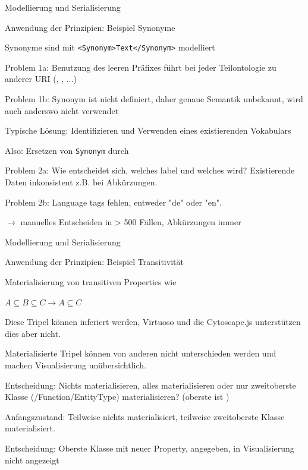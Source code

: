 \documentclass[14pt,aspectratio=1610]{beamer}
\begin{document}
\begin{frame}[fragile]{Modellierung und Serialisierung}
\begin{block}{Anwendung der Prinzipien: Beispiel Synonyme}
\begin{itemize}
{
\item Synonyme sind mit \texttt{<Synonym>Text</Synonym>} modelliert 
\item Problem 1a: Benutzung des leeren Präfixes führt bei jeder Teilontologie zu anderer URI (, , $\ldots$) 
\item Problem 1b: Synonym ist nicht definiert, daher genaue Semantik unbekannt, wird auch anderswo nicht verwendet
}
{
\item Typische Lösung: Identifizieren und Verwenden eines existierenden Vokabulars
\item Also: Ersetzen von \texttt{Synonym} durch \texttt{}
\item Problem 2a: Wie entscheidet sich, welches label  und welches  wird? Existierende Daten inkonsistent z.B. bei Abkürzungen. 
\item Problem 2b: Language tags fehlen, entweder "de" oder "en".
\item $\rightarrow$ manuelles Entscheiden in > 500 Fällen, Abkürzungen immer 
}
\end{itemize}
\end{block}
\end{frame}

\begin{frame}[fragile]{Modellierung und Serialisierung}
\begin{block}{Anwendung der Prinzipien: Beispiel Transitivität}
\begin{itemize}
{
\item Materialisierung von transitiven Properties wie 
\item $A \subseteq B \subseteq C \rightarrow A \subseteq C$
\item Diese Tripel können inferiert werden, Virtuoso und die Cytoscape.js unterstützen dies aber nicht.
\item Materialisierte Tripel können von anderen nicht unterschieden werden und machen Visualisierung unübersichtlich.
}
{
\item Entscheidung: Nichts materialisieren, alles materialisieren oder nur zweitoberste Klasse (/Function/EntityType) materialisieren? (oberste ist )
\item Anfangszustand: Teilweise nichts materialisiert, teilweise zweitoberste Klasse materialisiert.
\item Entscheidung: Oberste Klasse mit neuer Property,  angegeben, in Visualisierung nicht angezeigt
}
\end{itemize}
\end{block}
\end{frame}
\end{document}

